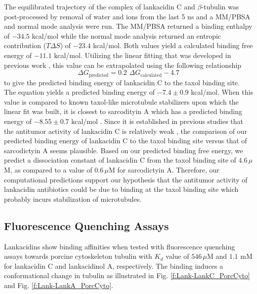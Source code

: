 \documentclass[11pt]{report}
\begin{document}
The equilibrated trajectory of the complex of
lankacidin C and $\beta$-tubulin was post-processed by removal of
water and ions from the last 5 ns and a MM/PBSA and normal mode analysis 
were run. The MM/PBSA returned a binding enthalpy of 
$-34.5$ kcal/mol while the normal mode analysis returned an
entropic contribution ($T\Delta S$) of $-23.4$ kcal/mol. Both
values yield a calculated binding free energy of $-11.1$ kcal/mol.
Utilizing the linear fitting that was developed in previous
work \cite{Ayoub2013}, this value can be extrapolated using the 
following relationship
\begin{equation}
\Delta G_\text{predicted} = 0.2\,\,\Delta G_\text{calculated} - 4.7
\end{equation}
to give the predicted binding energy of lankacidin C to 
the taxol binding site. The equation yields a predicted
binding energy of $-7.4\pm0.9$ kcal/mol. When this value
is compared to known taxol-like microtubule stabilizers upon which the linear fit was built, it is closest to sarcodityin A which has a predicted
binding energy of $-8.55\pm0.7$ kcal/mol \cite{Ayoub2013}. Since it is 
established in previous studies that the antitumor activity of 
lankacidin C is relatively weak \cite{Ootsu1973,Ootsu1975},
the comparison of our predicted binding energy of lankacidin C
to the taxol binding site versus that of sarcodictyin A
seems plausible. Based on our predicted binding free energy,
we predict a dissociation constant of lankacidin C from the 
taxol binding site of $4.6\,\mu$M, as compared to a value of $0.6\,\mu$M
for sarcodictyin A.
Therefore, our computational predictions support our hypothesis
that the antitumor activity of lankacidin antibiotics could be
due to binding at the taxol binding site which probably incurs stabilization of
microtubules.

\subsection{Fluorescence Quenching Assays}

Lankacidins show binding affinities when tested with fluorescence quenching assays towards porcine cytoskeleton tubulin with $K_d$ value of $546\,\mu$M and $1.1$ mM for lankacidin C and lankacidinol A, respectively. The binding induces a conformational change in tubulin as illustrated in
Fig. \ref{f:Lank-LankC_PorcCyto} and Fig. \ref{f:Lank-LankA_PorcCyto}.
\end{document}

